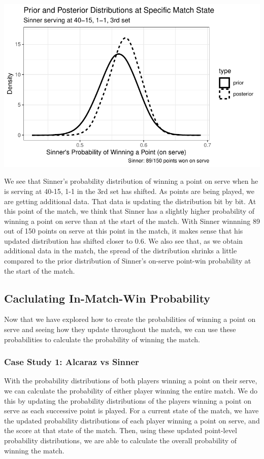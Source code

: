 \documentclass[
  letterpaper,
  DIV=11,
  numbers=noendperiod]{scrartcl}
\begin{document}
\includegraphics{Project_Write_Up_files/figure-pdf/unnamed-chunk-16-1.pdf}

\linespread{2}

We see that Sinner's probability distribution of winning a point on
serve when he is serving at 40-15, 1-1 in the 3rd set has shifted. As
points are being played, we are getting additional data. That data is
updating the distribution bit by bit. At this point of the match, we
think that Sinner has a slightly higher probability of winning a point
on serve than at the start of the match. With Sinner winnning 89 out of
150 points on serve at this point in the match, it makes sense that his
updated distribution has shifted closer to 0.6. We also see that, as we
obtain additional data in the match, the spread of the distribution
shrinks a little compared to the prior distribution of Sinner's on-serve
point-win probability at the start of the match.

\subsection{Caclulating In-Match-Win
Probability}\label{caclulating-in-match-win-probability}

Now that we have explored how to create the probabilities of winning a
point on serve and seeing how they update throughout the match, we can
use these probabilities to calculate the probability of winning the
match.

\subsubsection{Case Study 1: Alcaraz vs Sinner}\label{sec-alcsin}

With the probability distributions of both players winning a point on
their serve, we can calculate the probability of either player winning
the entire match. We do this by updating the probability distributions
of the players winning a point on serve as each successive point is
played. For a current state of the match, we have the updated
probability distributions of each player winning a point on serve, and
the score at that state of the match. Then, using these updated
point-level probability distributions, we are able to calculate the
overall probability of winning the match.
\end{document}
